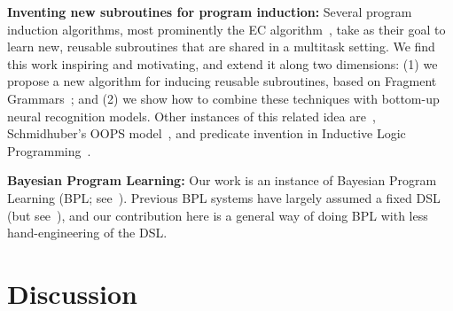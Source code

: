 \documentclass{article}
\begin{document}
 \noindent \textbf{Inventing new subroutines for program induction:}
 Several program induction algorithms, most prominently the EC algorithm~\cite{Dechter:2013:BLV:2540128.2540316}, take as their goal to learn new, reusable subroutines that are shared in a multitask setting. We find this work inspiring and motivating,
 and extend it along two dimensions: (1) we propose a new algorithm for
 inducing reusable subroutines, based on Fragment Grammars~\cite{tim};
 and (2) we show how to combine these techniques with bottom-up neural recognition models.
 Other instances of this related idea are~\cite{DBLP:conf/icml/LiangJK10}, Schmidhuber's OOPS model~\cite{schmidhuber2004optimal}, and predicate invention in Inductive Logic Programming~\cite{DBLP:conf/ecai/LinDETM14}.
 
\noindent\textbf{Bayesian Program
 Learning:} Our work is an instance of
 Bayesian Program
 Learning (BPL; see~\citep{lake2015human,Dechter:2013:BLV:2540128.2540316,ellis2016sampling,DBLP:conf/icml/LiangJK10}). Previous BPL systems have largely assumed a fixed DSL (but see~\cite{DBLP:conf/icml/LiangJK10}),
 and our contribution here is a general way of doing BPL with less hand-engineering of the DSL.
 
\section{Discussion}
\end{document}
